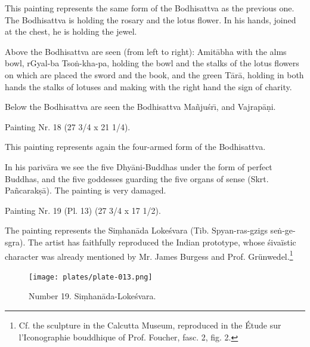 \documentclass[a4paper, 12pt, oneside]{article}
\begin{document}
This painting represents the same form of the Bodhisattva as the previous one. The Bodhisattva is holding the rosary and the lotus flower. In his hands, joined at the chest, he is holding the jewel.

Above the Bodhisattva are seen (from left to right): Amit\={a}bha with the alms bowl, rGyal-ba Tso\.{n}-kha-pa, holding the bowl and the stalks of the lotus flowers on which are placed the sword and the book, and the green T\={a}r\={a}, holding in both hands the stalks of lotuses and making with the right hand the sign of charity.

Below the Bodhisattva are seen the Bodhisattva Ma\~{n}ju\'{s}r\={\i}, and Vajrap\={a}\d{n}i.

\bigskip

Painting Nr. 18 (27 3/4 x 21 1/4).

\bigskip

This painting represents again the four-armed form of the Bodhisattva.

In his pariv\={a}ra we see the five Dhy\={a}ni-Buddhas under the form of perfect Buddhas, and the five goddesses guarding the five organs of sense (Skrt. Pa\~{n}carak\d{s}\={a}). The painting is very damaged.

\bigskip

Painting Nr. 19 (Pl. 13) (27 3/4 x 17 1/2).
 
\bigskip

The painting represents the Si\d{m}han\={a}da Loke\'{s}vara (Tib. Spyan-ras-gzigs se\.{n}-ge-sgra). The artist has faithfully reproduced the Indian prototype, whose \'{s}ivaïstic character was already mentioned by Mr. James Burgess and Prof. Grünwedel.\footnote{Cf. the sculpture in the Calcutta Museum, reproduced in the Étude sur l'Iconographie bouddhique of Prof. Foucher, fasc. 2, fig. 2.}

\clearpage
\vspace*{\fill}
\begin{figure}[H]
\centering
\texttt{[image: plates/plate-013.png]}
\caption*{Number 19. Si\d{m}han\={a}da-Loke\'{s}vara.}
\end{figure}
\vspace*{\fill}
\clearpage
\end{document}
